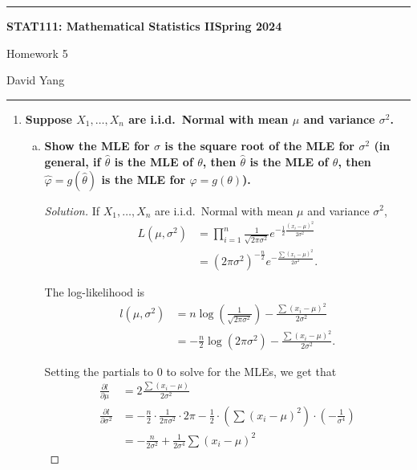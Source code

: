 \documentclass[11pt]{article}
\newenvironment{solution}
  {\renewcommand\qedsymbol{$\blacksquare$}\begin{proof}[Solution]}
  {\end{proof}}
\begin{document}
	\hrule
	\begin{center}
        \textbf{STAT111: Mathematical Statistics II}\hfill \textbf{Spring 2024}\newline

		{\Large Homework 5}

		David Yang
	\end{center}

\hrule

\vspace{1em}

\begin{enumerate}
    \item \textbf{Suppose $X_1, \dots, X_n$ are i.i.d.\ Normal with mean $\mu$ and variance $\sigma^2$.}
    
    \begin{enumerate}[a)]
        \item \textbf{Show the MLE for $\sigma$ is the square root of the MLE for $\sigma^2$ (in general, if $\hat{\theta}$ is the MLE of $\theta$,
        then $\hat{\theta}$ is the MLE of $\theta$, then $\hat{\varphi} = g(\hat{\theta})$ is the MLE for $\varphi = g(\theta)$).}

        \begin{solution}
        If $X_1, \dots, X_n$ are i.i.d.\ Normal with mean $\mu$ and variance $\sigma^2$, 
        \begin{align*}
            L(\mu, \sigma^2) &= \prod_{i=1}^n \frac{1}{\sqrt{2\pi \sigma^2}} e^{-\frac{1}{2}\frac{\left(x_i - \mu\right)^2}{2\sigma^2}} \\
            &= \left( 2\pi \sigma^2 \right)^{-\frac{n}{2}} e^{-\frac{\sum(x_i - \mu)^2}{2\sigma^2}}.
        \end{align*}

        The log-likelihood is 
        \begin{align*}
            l(\mu , \sigma^2) &= n \log \left( \frac{1}{\sqrt{2\pi \sigma^2} } \right) - \frac{\sum (x_i - \mu)^2}{2\sigma^2} \\
            &= -\frac{n}{2} \log \left( 2\pi \sigma^2 \right) - \frac{\sum (x_i - \mu)^2}{2\sigma^2}.
        \end{align*}

        Setting the partials to $0$ to solve for the MLEs, we get that
        \begin{align*}
            \frac{\partial l}{\partial \mu} &= 2 \frac{\sum(x_i - \mu)}{2\sigma^2}\\
            \frac{\partial l}{\partial \sigma^2} &= -\frac{n}{2} \cdot \frac{1}{2\pi \sigma^2} \cdot 2\pi - \frac{1}{2} \cdot \left( \sum (x_i - \mu )^2 \right) \cdot \left( -\frac{1}{\sigma^4} \right) \\
            &= -\frac{n}{2\sigma^2} + \frac{1}{2\sigma^4} \sum (x_i - \mu)^2
        \end{align*}


\end{solution}
\end{enumerate}
\end{enumerate}
\end{document}
